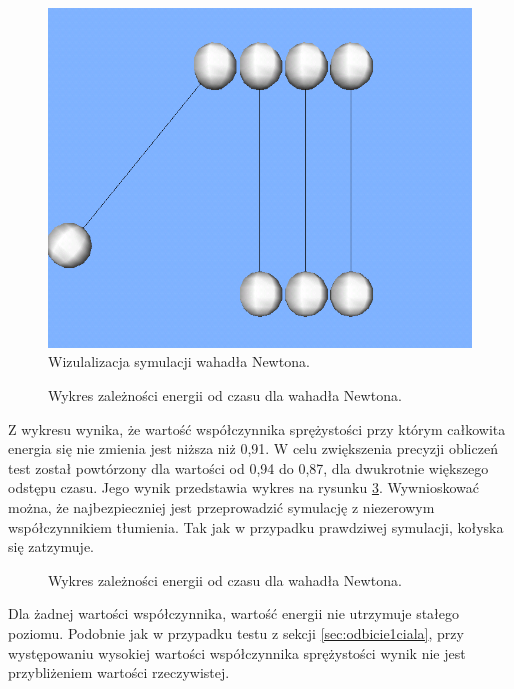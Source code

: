 \begin{figure}
\centering
\includegraphics[scale=0.5]{img/newtonPendulum.png}
\caption{Wizulalizacja symulacji wahadła Newtona.}
\label{fig:newtonPendulum}
\end{figure}

\begin{figure}
\centering

\caption{Wykres zależności energii od czasu dla wahadła Newtona.}
\label{fig:wahadloNewtona1}
\end{figure}

Z wykresu wynika, że wartość współczynnika sprężystości przy którym całkowita
energia się nie zmienia jest niższa niż 0,91. W celu zwiększenia precyzji
obliczeń test został powtórzony dla wartości od 0,94 do 0,87, dla dwukrotnie
większego odstępu czasu. Jego wynik przedstawia wykres na rysunku
\ref{fig:wahadloNewtona2}. Wywnioskować można, że najbezpieczniej jest
przeprowadzić symulację z niezerowym współczynnikiem tłumienia. Tak jak w
przypadku prawdziwej symulacji, kołyska się zatzymuje.

\begin{figure}
\centering

\caption{Wykres zależności energii od czasu dla wahadła Newtona.}
\label{fig:wahadloNewtona2}
\end{figure}

Dla żadnej wartości współczynnika, wartość energii nie utrzymuje stałego
poziomu. Podobnie jak w przypadku testu z sekcji \ref{sec:odbicie1ciala}, przy
występowaniu wysokiej wartości współczynnika sprężystości wynik nie jest
przybliżeniem wartości rzeczywistej.

